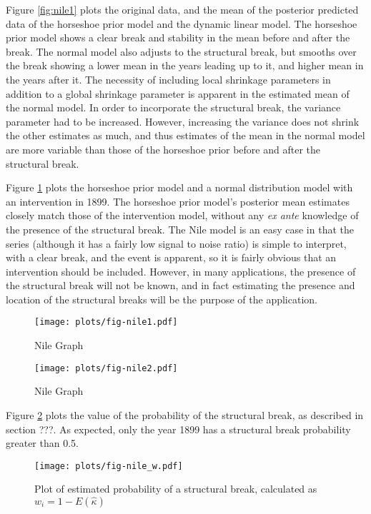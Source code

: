 \documentclass{article}
\begin{document}
Figure \ref{fig:nile1} plots the original data, and the mean of the posterior predicted data of the horseshoe prior model and the dynamic linear model.
The horseshoe prior model shows a clear break and stability in the mean before and after the break.
The normal model also adjusts to the structural break, but smooths over the break showing a lower mean in the years leading up to it, and higher mean in the years after it.
The necessity of including local shrinkage parameters in addition to a global shrinkage parameter is apparent in the estimated mean of the normal model.
In order to incorporate the structural break, the variance parameter had to be increased.
However, increasing the variance does not shrink the other estimates as much, and thus estimates of the mean in the normal model are more variable than those of the horseshoe prior before and after the structural break.

Figure \ref{fig:nile2} plots the horseshoe prior model and a normal distribution model with an intervention in 1899.
The horseshoe prior model's posterior mean estimates closely match those of the intervention model, without any \textit{ex ante} knowledge of the presence of the structural break.
The Nile model is an easy case in that the series (although it has a fairly low signal to  noise ratio) is simple to interpret, with a clear break, and the event is apparent, so it is fairly obvious that an intervention should be included.
However, in many applications, the presence of the structural break will not be known, and in fact estimating the presence and location of the structural breaks will be the purpose of the application.

\begin{figure}[htpb]
  \centering
  \texttt{[image: plots/fig-nile1.pdf]}  
  \caption{Nile Graph}
  \label{fig:nile1}

  \texttt{[image: plots/fig-nile2.pdf]}
  \caption{Nile Graph}
  \label{fig:nile2}
\end{figure}

Figure \ref{fig:nile_w} plots the value of the probability of the structural break, as described in section ???.
As expected, only the year 1899 has a structural break probability greater than 0.5.

\begin{figure}[htpb]
  \centering
  \texttt{[image: plots/fig-nile\_w.pdf]}
  \caption{Plot of estimated probability of a structural break, calculated as $w_{i} = 1 - E(\hat{\kappa})$}
  \label{fig:nile_w}
\end{figure}
\end{document}
